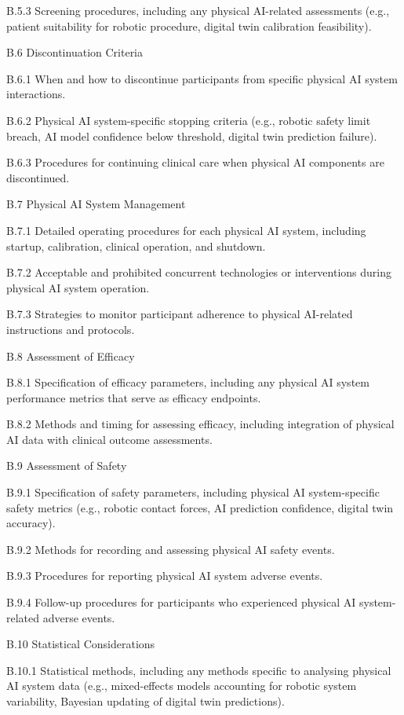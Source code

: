 \documentclass[11pt]{article}
\begin{document}
B.5.3 Screening procedures, including any physical AI-related assessments (e.g., patient suitability for robotic procedure, digital twin calibration feasibility).

B.6 Discontinuation Criteria

B.6.1 When and how to discontinue participants from specific physical AI system interactions.

B.6.2 Physical AI system-specific stopping criteria (e.g., robotic safety limit breach, AI model confidence below threshold, digital twin prediction failure).

B.6.3 Procedures for continuing clinical care when physical AI components are discontinued.

B.7 Physical AI System Management

B.7.1 Detailed operating procedures for each physical AI system, including startup, calibration, clinical operation, and shutdown.

B.7.2 Acceptable and prohibited concurrent technologies or interventions during physical AI system operation.

B.7.3 Strategies to monitor participant adherence to physical AI-related instructions and protocols.

B.8 Assessment of Efficacy

B.8.1 Specification of efficacy parameters, including any physical AI system performance metrics that serve as efficacy endpoints.

B.8.2 Methods and timing for assessing efficacy, including integration of physical AI data with clinical outcome assessments.

B.9 Assessment of Safety

B.9.1 Specification of safety parameters, including physical AI system-specific safety metrics (e.g., robotic contact forces, AI prediction confidence, digital twin accuracy).

B.9.2 Methods for recording and assessing physical AI safety events.

B.9.3 Procedures for reporting physical AI system adverse events.

B.9.4 Follow-up procedures for participants who experienced physical AI system-related adverse events.

B.10 Statistical Considerations

B.10.1 Statistical methods, including any methods specific to analysing physical AI system data (e.g., mixed-effects models accounting for robotic system variability, Bayesian updating of digital twin predictions).
\end{document}
